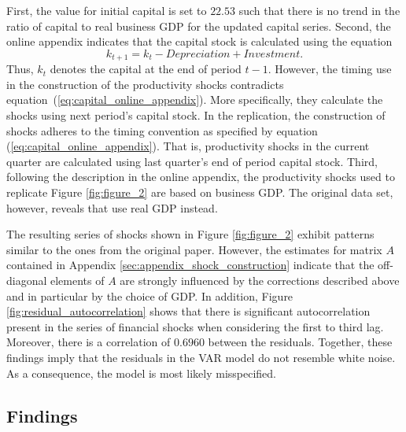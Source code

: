 First, the value for initial capital is set to $22.53$ such that there is no trend in the ratio of capital to real business GDP for the updated capital series. Second, the online appendix indicates that the capital stock is calculated using the equation
\begin{equation} 
	\label{eq:capital_online_appendix}
	k_{t+1} = k_{t} - Depreciation + Investment.
\end{equation} 
Thus, ${k}_t$ denotes the capital at the end of period $t-1$. However, the timing \citeauthor{JERMANNfinancial} use in the construction of the productivity shocks contradicts equation~(\ref{eq:capital_online_appendix}). More specifically, they calculate the shocks using next period's capital stock. In the replication, the construction of shocks adheres to the timing convention as specified by equation (\ref{eq:capital_online_appendix}). That is, productivity shocks in the current quarter are calculated using last quarter's end of period capital stock. Third, following the description in the online appendix, the productivity shocks used to replicate Figure \ref{fig:figure_2} are based on business GDP. The original data set, however, reveals that \citeauthor{JERMANNfinancial} use real GDP instead. 

The resulting series of shocks shown in Figure \ref{fig:figure_2} exhibit patterns similar to the ones from the original paper. However, the estimates for matrix $A$ contained in Appendix \ref{sec:appendix_shock_construction} indicate that the off-diagonal elements of $A$ are strongly influenced by the corrections described above and in particular by the choice of GDP. In addition, Figure \ref{fig:residual_autocorrelation} shows that there is significant autocorrelation present in the series of financial shocks when considering the first to third lag. Moreover, there is a correlation of $0.6960$ between the residuals. Together, these findings imply that the residuals in the VAR model do not resemble white noise. As a consequence, the model is most likely misspecified.


\subsection{Findings}
\label{sec:findings}



